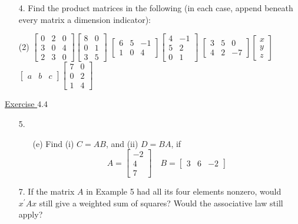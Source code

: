 \documentclass{./../../Latex/handout}
\begin{document}
\begin{itemize}
\item[4.] Find the product matrices in the following (in each case, append beneath every matrix a dimension indicator): 
\begin{tasks}(2)
\task[(a)] $\left[\begin{array}{lll}0 & 2 & 0 \\ 3 & 0 & 4 \\ 2 & 3 & 0\end{array}\right]\left[\begin{array}{ll}8 & 0 \\ 0 & 1 \\ 3 & 5\end{array}\right]$
\task[(b)] $\left[\begin{array}{rrr}6 & 5 & -1 \\ 1 & 0 & 4\end{array}\right]\left[\begin{array}{rr}4 & -1 \\ 5 & 2 \\ 0 & 1\end{array}\right]$
\task[(c)] $\left[\begin{array}{rrr}3 & 5 & 0 \\ 4 & 2 & -7\end{array}\right]\left[\begin{array}{l}x \\ y \\ z\end{array}\right]$
\task[(d)] $\left[\begin{array}{lll}a & b & c\end{array}\right]\left[\begin{array}{ll}7 & 0 \\ 0 & 2 \\ 1 & 4\end{array}\right]$ 
\end{tasks}
\end{itemize}

\underline{Exercise $4.4$}
\begin{itemize}
	
\item[5.] 
\begin{itemize}
\item[(e)] Find (i) $C=A B$, and (ii) $D=B A$, if
$$
A=\left[\begin{array}{r}
-2 \\
4 \\
7
\end{array}\right] \quad B=\left[\begin{array}{lll}
3 & 6 & -2
\end{array}\right]
$$
\end{itemize}

\item[7.] If the matrix $A$ in Example 5 had all its four elements nonzero, would $x^{\prime} A x$ still give a weighted sum of squares? Would the associative law still apply? \\
\end{itemize}
\end{document}
